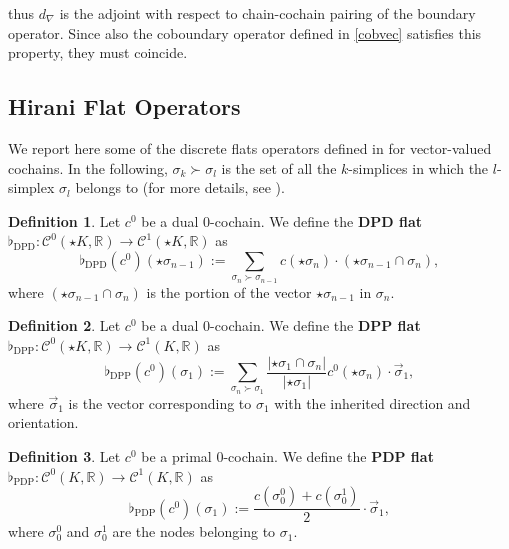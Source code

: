 \documentclass{article}
\theoremstyle{definition} %
\newtheorem{Def}{Definition}
\theoremstyle{plain} %
\theoremstyle{remark} %
\newcommand{\rr}{\mathbb{R}}
\begin{document}
thus $d_\nabla$ is the adjoint with respect to chain-cochain pairing of the boundary operator. Since also the coboundary operator defined in \eqref{cobvec} satisfies this property, they must coincide.

\subsection{Hirani Flat Operators} 
We report here some of the discrete flats operators defined in \cite{hirani2003discrete} for vector-valued cochains. In the following, $\sigma_k \succ \sigma_l$ is the set of all the $k$-simplices in which the $l$-simplex $\sigma_l$ belongs to (for more details, see \cite{hirani2003discrete}).

\begin{Def}
    Let $c^0$ be a dual $0$-cochain. We define the \textbf{DPD flat} $\flat_{\text{DPD}}: \mathcal{C}^0(\star K, \rr) \rightarrow \mathcal{C}^1(\star K, \rr)$ as
    \begin{equation}
        \flat_{\text{DPD}}(c^0)(\star \sigma_{n-1}) := \sum_{\sigma_n \succ \sigma_{n-1}} c(\star \sigma_n) \cdot (\star \sigma_{n-1} \cap \sigma_n),
    \end{equation}
    where $(\star \sigma_{n-1} \cap \sigma_n)$ is the portion of the vector $\star \sigma_{n-1}$ in $\sigma_n$.
\end{Def}

\begin{Def}
    Let $c^0$ be a dual $0$-cochain. We define the \textbf{DPP flat} $\flat_{\text{DPP}}: \mathcal{C}^0(\star K, \rr) \rightarrow \mathcal{C}^1( K, \rr)$ as
    \begin{equation}
        \flat_{\text{DPP}}(c^0)(\sigma_{1}) := \sum_{\sigma_n \succ \sigma_1} \frac{|\star \sigma_1 \cap \sigma_n|}{|\star \sigma_1|} c^0(\star \sigma_n) \cdot \Vec{\sigma}_1,
    \end{equation}
    where $\Vec{\sigma}_1$ is the vector corresponding to $\sigma_1$ with the inherited direction and orientation.
\end{Def}

\begin{Def}
    Let $c^0$ be a primal $0$-cochain. We define the \textbf{PDP flat} $\flat_{\text{PDP}}: \mathcal{C}^0(K, \rr) \rightarrow \mathcal{C}^1( K, \rr)$ as
    \begin{equation}
         \flat_{\text{PDP}}(c^0)(\sigma_{1}) := \frac{c(\sigma^0_0) + c(\sigma^1_0)}{2} \cdot \Vec{\sigma}_1,
    \end{equation}
    where $\sigma^0_0$ and $\sigma^1_0$ are the nodes belonging to $\sigma_1$.
\end{Def}
\end{document}
